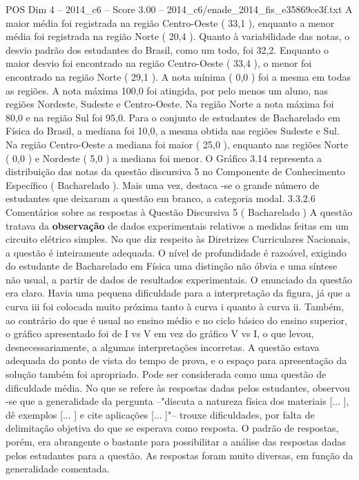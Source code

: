 \begin{textsample}{POS Dim 4 – 2014\_c6 – Score 3.00 – 2014\_c6/enade\_2014\_fis\_e35869ce3f.txt}
A maior média foi registrada na região Centro-Oeste ( 33,1 ), enquanto a menor média foi registrada na região Norte ( 20,4 ).
Quanto à variabilidade das notas, o desvio padrão dos estudantes do Brasil, como um todo, foi 32,2.
Enquanto o maior desvio foi encontrado na região Centro-Oeste ( 33,4 ), o menor foi encontrado na região Norte ( 29,1 ).
A nota mínima ( 0,0 ) foi a mesma em todas as regiões.
A nota máxima 100,0 foi atingida, por pelo menos um aluno, nas regiões Nordeste, Sudeste e Centro-Oeste.
Na região Norte a nota máxima foi 80,0 e na região Sul foi 95,0.
Para o conjunto de estudantes de Bacharelado em Física do Brasil, a mediana foi 10,0, a mesma obtida nas regiões Sudeste e Sul.
Na região Centro-Oeste a mediana foi maior ( 25,0 ), enquanto nas regiões Norte ( 0,0 ) e Nordeste ( 5,0 ) a mediana foi menor.
O Gráfico 3.14 representa a distribuição das notas da questão discursiva 5 no Componente de Conhecimento Específico ( Bacharelado ).
Mais uma vez, destaca -se o grande número de estudantes que deixaram a questão em branco, a categoria modal. 3.3.2.6 Comentários sobre as respostas à Questão Discursiva 5 ( Bacharelado ) A questão tratava da \textbf{observação} de dados experimentais relativos a medidas feitas em um circuito elétrico simples.
No que diz respeito às Diretrizes Curriculares Nacionais, a questão é inteiramente adequada.
O nível de profundidade é razoável, exigindo do estudante de Bacharelado em Física uma distinção não óbvia e uma síntese não usual, a partir de dados de resultados experimentais.
O enunciado da questão era claro.
Havia uma pequena dificuldade para a interpretação da figura, já que a curva iii foi colocada muito próxima tanto à curva i quanto à curva ii.
Também, ao contrário do que é usual no ensino médio e no ciclo básico do ensino superior, o gráfico apresentado foi de I vs V em vez do gráfico V vs I, o que levou, desnecessariamente, a algumas interpretações incorretas.
A questão estava adequada do ponto de vista do tempo de prova, e o espaço para apresentação da solução também foi apropriado.
Pode ser considerada como uma questão de dificuldade média.
No que se refere às respostas dadas pelos estudantes, observou -se que a generalidade da pergunta –"discuta a natureza física dos materiais [... ], dê exemplos [... ] e cite aplicações [... ]"– trouxe dificuldades, por falta de delimitação objetiva do que se esperava como resposta.
O padrão de respostas, porém, era abrangente o bastante para possibilitar a análise das respostas dadas pelos estudantes para a questão.
As respostas foram muito diversas, em função da generalidade comentada.

\end{textsample}

